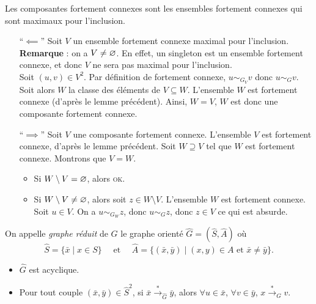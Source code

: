\begin{prop}
	Les composantes fortement connexes sont les ensembles fortement connexes qui sont maximaux pour l'inclusion.
\end{prop}

\begin{prv}
	\begin{itemize}
		\item[``$\impliedby$'']
			Soit $V$\/ un ensemble fortement connexe maximal pour l'inclusion.\\
			\textbf{Remarque} : on a $V \neq \varnothing$. En effet, un singleton est un ensemble fortement connexe, et donc $V$\/ ne sera pas maximal pour l'inclusion.\\
			Soit $(u,v) \in V^2$. Par définition de fortement connexe, $u \sim_{G_V} v$\/ donc $u \sim_G v$.
			Soit alors $W$\/ la classe des éléments de $V \subseteq W$.
			L'ensemble $W$\/ est fortement connexe (d'après le lemme précédent).
			Ainsi, $W = V$, $W$\/ est donc une composante fortement connexe.
		\item[``$\implies$''] Soit $V$\/ une composante fortement connexe.
			L'ensemble $V$\/ est fortement connexe, d'après le lemme précédent.
			Soit $W\supseteq V$\/ tel que $W$\/ est fortement connexe. Montrons que $V = W$.
			\begin{itemize}
				\item Si $W \setminus V = \varnothing$, alors \textsc{ok}.
				\item Si $W \setminus V \neq \varnothing$, alors soit $z \in W \setminus V$.
					L'ensemble $W$\/ est fortement connexe. Soit $u \in V$. On a $u \sim_{G_W} z$, donc $u \sim_G z$, donc $z \in V$\/ ce qui est absurde.
			\end{itemize}
	\end{itemize}
\end{prv}

\begin{defn}
	On appelle \textit{graphe réduit} de $G$\/ le graphe orienté $\hat G = (\hat S, \hat A)$\/ où \[
		\hat{S} = \{\bar{x}  \mid x \in S\}  \quad \text{ et } \quad \hat{A} = \big\{(\bar{x},\bar{y})  \mid (x,y) \in A \text{ et } \bar{x} \neq \bar{y}\big\}
	.\]
\end{defn}

\begin{exm}
\end{exm}

\begin{rmk}
	\begin{itemize}
		\item $\hat{G}$\/ est acyclique.
		\item Pour tout couple $(\bar{x}, \bar{y}) \in \hat{S}^2$, si $\bar{x} \xrightarrow{*}_{\hat{G}} \bar{y}$, alors $\forall u \in \bar{x}$, $\forall v \in \bar{y}$, $x\xrightarrow{*}_G v$.
	\end{itemize}
\end{rmk}


